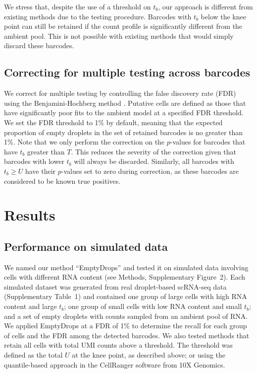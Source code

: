 \documentclass[10pt,letterpaper]{article}
\newcommand{\supptabdataset}{1}
\newcommand{\suppfigsimdesign}{2}
\begin{document}
We stress that, despite the use of a threshold on $t_b$, our approach is different from existing methods due to the testing procedure.
Barcodes with $t_b$ below the knee point can still be retained if the count profile is significantly different from the ambient pool.
This is not possible with existing methods that would simply discard these barcodes.

\subsection*{Correcting for multiple testing across barcodes}
We correct for multiple testing by controlling the false discovery rate (FDR) using the Benjamini-Hochberg method \cite{benjamini1995controlling}.
Putative cells are defined as those that have significantly poor fits to the ambient model at a specified FDR threshold.
We set the FDR threshold to 1\% by default, meaning that the expected proportion of empty droplets in the set of retained barcodes is no greater than 1\%.
Note that we only perform the correction on the $p$-values for barcodes that have $t_b$ greater than $T$.
This reduces the severity of the correction given that barcodes with lower $t_b$ will always be discarded.
Similarly, all barcodes with $t_b \ge U$ have their $p$-values set to zero during correction, as these barcodes are considered to be known true positives.

\section*{Results}

\subsection*{Performance on simulated data}
We named our method ``EmptyDrops'' and tested it on simulated data involving cells with different RNA content (see Methods, Supplementary Figure~\suppfigsimdesign{}).
Each simulated dataset was generated from real droplet-based scRNA-seq data (Supplementary Table~\supptabdataset{}) 
and contained one group of large cells with high RNA content and large $t_b$;
one group of small cells with low RNA content and small $t_b$; 
and a set of empty droplets with counts sampled from an ambient pool of RNA.
We applied EmptyDrops at a FDR of 1\% to determine the recall for each group of cells and the FDR among the detected barcodes.
We also tested methods that retain all cells with total UMI counts above a threshold.
The threshold was defined as the total $U$ at the knee point, as described above;
or using the quantile-based approach \cite{zheng2017massively} in the CellRanger software from 10X Genomics.
\end{document}
